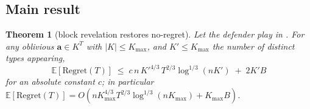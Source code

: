 \documentclass[letterpaper,9pt,twocolumn]{extarticle}
\newcommand{\avec}{\mathbf{a}}
\newcommand{\EE}{\mathbb{E}}
\newcommand{\Kmax}{K_{\max}}
\newcommand{\Regret}{\mathrm{Regret}}
\theoremstyle{plain}
\newtheorem{theorem}{Theorem}
\theoremstyle{definition}
\theoremstyle{remark}
\begin{document}
\subsection{Main result}

\begin{theorem}[block revelation restores no-regret]
\label{thm:block}
Let the defender play  in . For any oblivious
$\avec\in K^T$ with $|K|\le\Kmax$, and $K'\le\Kmax$ the number of distinct
types appearing,
\begin{equation}
\EE[\Regret(T)]\;\le\;
c\, n\,K'^{4/3}\,T^{2/3}\log^{1/3}(nK')\;+\;2K'B
\label{eq:block-main}
\end{equation}
for an absolute constant $c$; in particular
$\EE[\Regret(T)]=O(n\Kmax^{4/3}T^{2/3}\log^{1/3}(n\Kmax)+\Kmax B)$.
\end{theorem}
\end{document}
